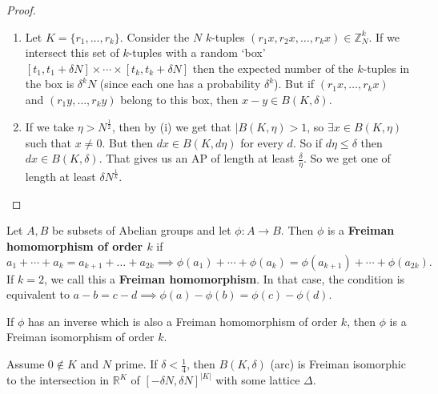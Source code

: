 \documentclass{article}
\newcommand{\1}[1]{\mathbbm{1}_{#1}}
\begin{document}
\begin{proof}\leavevmode
  \begin{enumerate}[label=(\roman*)]
    \item Let $K = \{r_1, \dotsc, r_k\}$. Consider the $N$ $k$-tuples $(r_1 x, r_2 x, \dotsc, r_k x) \in \mathbb{Z}_N^k$.
      If we intersect this set of $k$-tuples with a random `box' $[t_1, t_1 + \delta N] \times \dotsm \times [t_k, t_k + \delta N]$
      then the expected number of the $k$-tuples in the box is $\delta^k N$ (since each one has a probability $\delta^k$).
      But if $(r_1 x, \dotsc, r_k x)$ and $(r_1 y, \dotsc, r_k y)$ belong to this box, then $x - y \in B(K, \delta)$.
    \item If we take $\eta > N^{\frac{1}{2}}$, then by (i) we get that $|B(K, \eta) > 1$, so $\exists x \in B(K, \eta)$ such that $x \neq 0$.
      But then $d x \in B(K, d \eta)$ for every $d$.
      So if $d \eta \leq \delta$ then $d x \in B(K, \delta)$. That gives us an AP of length at least $\frac{\delta}{\eta}$.
      So we get one of length at least $\delta N^\frac{1}{k}$. \qedhere
  \end{enumerate}
\end{proof}
\begin{defi}
  Let $A,B$ be subsets of Abelian groups and let $\phi : A \to B$.
  Then $\phi$ is a \textbf{Freiman homomorphism of order $k$} if
  \begin{equation*}
    a_1 + \dotsb + a_k = a_{k+1} + \dotsc + a_{2k} \implies \phi(a_1) + \dotsb + \phi(a_k) = \phi(a_{k+1}) + \dotsb + \phi(a_{2k}).
  \end{equation*}
  If $k=2$, we call this a \textbf{Freiman homomorphism}.
  In that case, the condition is equivalent to $a - b = c - d \implies \phi(a) - \phi(b) = \phi(c) - \phi(d)$.

  If $\phi$ has an inverse which is also a Freiman homomorphism of order $k$, then $\phi$ is a Freiman isomorphism of order $k$.
\end{defi}
\begin{nlemma}\label{lem:1.9}
  Assume $0 \notin K$ and $N$ prime.
  If $\delta < \frac{1}{4}$, then $B(K, \delta)$ (arc) is Freiman isomorphic to the intersection in $\mathbb{R}^{K}$ of $[-\delta N, \delta N]^{|K|}$ with some lattice $\Delta$.
\end{nlemma}
\end{document}
